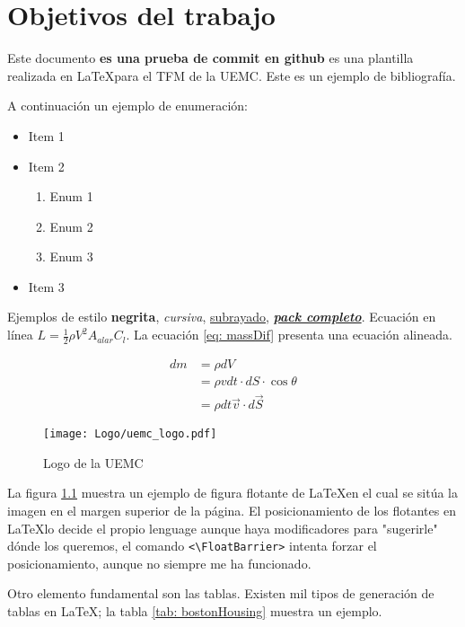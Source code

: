 \chapter{Objetivos del trabajo}

Este documento \textbf{es una prueba de commit en github} es una plantilla realizada en \LaTeX para el \gls{TFM} de la \gls{UEMC}. Este es un ejemplo de bibliografía\cite{Finazzi}.

A continuación un ejemplo de enumeración:
\begin{itemize}
	\item Item 1
	\item Item 2
	\begin{enumerate}
		\item Enum 1
		\item Enum 2
		\item Enum 3
	\end{enumerate}
	\item Item 3
\end{itemize}

Ejemplos de estilo \textbf{negrita}, \textit{cursiva}, \underline{subrayado}, \textbf{\textit{\underline{pack completo}}}. Ecuación en línea $L=\frac{1}{2}\rho V^2 A_{alar}C_l$. La ecuación \ref{eq: massDif} presenta una ecuación alineada.

\begin{align}
	\nonumber
	dm &= \rho dV \\ \nonumber
	   &= \rho v dt\cdot dS\cdot \cos{\theta}\\ \nonumber
	   &= \rho dt \overrightarrow{v}\cdot d\overrightarrow{S}
\end{align}\label{eq: massDif}

\begin{figure}[ht!]
	\centering
	\texttt{[image: Logo/uemc\_logo.pdf]}      
	\caption{Logo de la \gls{UEMC}}
	\label{fig: UEMC_logo}
\end{figure}
La figura \ref{fig: UEMC_logo} muestra un ejemplo de figura flotante de \LaTeX en el cual se sitúa la imagen en el margen superior de la página. El posicionamiento de los flotantes en \LaTeX lo decide el propio lenguage aunque haya modificadores para "sugerirle" dónde los queremos, el comando \verb_<\FloatBarrier>_ intenta forzar el posicionamiento, aunque no siempre me ha funcionado.

Otro elemento fundamental son las tablas. Existen mil tipos de generación de tablas en \LaTeX; la tabla \ref{tab: bostonHousing} muestra un ejemplo.

